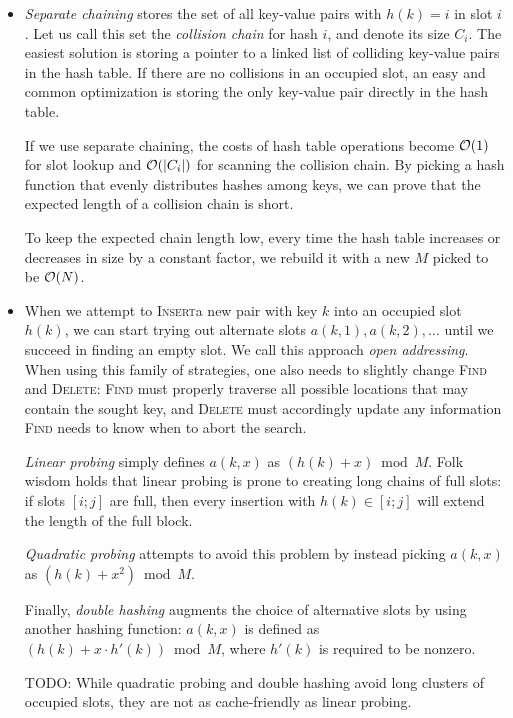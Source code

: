 \begin{itemize}
\item
\emph{Separate chaining} stores the set of all key-value pairs with
$h(k)=i$ in slot $i$. Let us call this set the \emph{collision chain} for hash
$i$, and denote its size $C_i$. The easiest solution is storing a pointer to
a linked list of colliding key-value pairs in the hash table. If there are no
collisions in an occupied slot, an easy and common optimization is storing
the only key-value pair directly in the hash table.

If we use separate chaining, the costs of hash table operations become $\mathcal{O}(1)$
for slot lookup and $\mathcal{O}(|C_i|)$ for scanning the collision chain. By picking
a hash function that evenly distributes hashes among keys, we can prove
that the expected length of a collision chain is short.

To keep the expected chain length low, every time the hash table increases
or decreases in size by a constant factor, we rebuild it with a new $M$
picked to be $\mathcal{O}(N)$.

\item
When we attempt to \textsc{Insert}a new pair with key $k$ into an occupied slot
$h(k)$, we can start trying out alternate slots $a(k,1), a(k,2), \ldots$
until we succeed in finding an empty slot. We call this approach \emph{open
addressing}. When using this family of strategies, one also needs to slightly
change \textsc{Find} and \textsc{Delete}: \textsc{Find} must properly traverse
all possible locations that may contain the sought key, and \textsc{Delete}
must accordingly update any information \textsc{Find} needs to know when to
abort the search.

\emph{Linear probing} simply defines $a(k,x)$ as $(h(k)+x) \bmod M$.
Folk wisdom holds that linear probing is prone to creating long chains
of full slots: if slots $[i;j]$ are full, then every insertion with
$h(k)\in[i;j]$ will extend the length of the full block.

\emph{Quadratic probing} attempts to avoid this problem by instead picking
$a(k,x)$ as $(h(k)+x^2) \bmod M$.

Finally, \emph{double hashing} augments the choice of alternative slots by using
another hashing function: $a(k,x)$ is defined as $(h(k)+x\cdot h'(k)) \bmod M$,
where $h'(k)$ is required to be nonzero.

TODO: While quadratic probing and double hashing avoid long clusters of occupied
slots, they are not as cache-friendly as linear probing.


\end{itemize}
